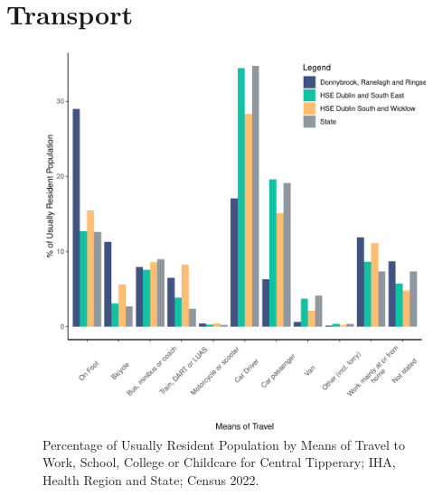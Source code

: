 \documentclass{article}
\begin{document}
\section{Transport}\label{sect:Trans}
\begin{figure}[H]
	\centering
	\includegraphics[width = 120mm]{../figures/TravelED.pdf}
	\caption{Percentage of Usually Resident Population by Means of Travel to Work, School, College or Childcare for Central Tipperary; IHA, Health Region and State; Census 2022.}
	\label{fig:vbnv}
	\end{figure}
\end{document}

